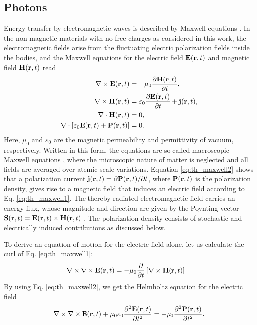 \subsection{Photons}
\label{sec:th_eom2_photon}
Energy transfer by electromagnetic waves is described by Maxwell equations \cite{jackson}. In the non-magnetic materials with no free charges as considered in this work, the electromagnetic fields arise from the fluctuating electric polarization fields inside the bodies, and the Maxwell equations for the electric field $\mathbf{E}(\mathbf{r},t)$ and magnetic field $\mathbf{H}(\mathbf{r},t)$ read \cite{novotny}
\begin{subequations}
\begin{align}
  \nabla \times \mathbf{E}(\mathbf{r},t) &= - \mu_0 \frac{\partial \mathbf{H}(\mathbf{r},t)}{\partial t}, \label{eq:th_maxwell1} \\
  \nabla \times \mathbf{H}(\mathbf{r},t) &= \varepsilon_0 \frac{\partial \mathbf{E}(\mathbf{r},t)}{\partial t} + \mathbf{j}(\mathbf{r},t) , \label{eq:th_maxwell2} \\
   \nabla \cdot \mathbf{H}(\mathbf{r},t) &= 0, \\
   \nabla \cdot \left[\varepsilon_0 \mathbf{E}(\mathbf{r},t)+\mathbf{P}(\mathbf{r},t)\right] &= 0.
\end{align}
\end{subequations}
Here, $\mu_0$ and $\varepsilon_0$ are the magnetic permeability and permittivity of vacuum, respectively. Written in this form, the equations are so-called macroscopic Maxwell equations \cite{novotny}, where the microscopic nature of matter is neglected and all fields are averaged over atomic scale variations. Equation \eqref{eq:th_maxwell2} shows that a polarization current $\mathbf{j}(\mathbf{r},t)=\partial \mathbf{P}(\mathbf{r},t)/\partial t$, where $\mathbf{P}(\mathbf{r},t)$ is the polarization density, gives rise to a magnetic field that induces an electric field according to Eq. \eqref{eq:th_maxwell1}. The thereby radiated electromagnetic field carries an energy flux, whose magnitude and direction are given by the Poynting vector $\mathbf{S}(\mathbf{r},t)=\mathbf{E}(\mathbf{r},t)\times \mathbf{H}(\mathbf{r},t)$ \cite{novotny}. The polarization density consists of stochastic and electrically induced contributions \cite{benabdallah11} as discussed below. 

To derive an equation of motion for the electric field alone, let us calculate the curl of Eq. \eqref{eq:th_maxwell1}:
\begin{alignat}{2}
  \nabla \times \nabla \times \mathbf{E}(\mathbf{r},t) &= - \mu_0 \frac{\partial}{\partial t} \left[\nabla \times \mathbf{H}(\mathbf{r},t) \right] 
\end{alignat}
By using Eq. \eqref{eq:th_maxwell2}, we get the Helmholtz equation for the electric field \cite{novotny}
\begin{equation}
   \nabla \times \nabla \times \bE(\br,t) + \mu_0 \varepsilon_0 \frac{\partial ^2\bb{E}(\br,t)}{\partial t^2}=  - \mu_0 \frac{\partial^2 \bb{P}(\br,t)}{\partial t^2}. \label{eq:th_eom_photons} %
\end{equation}


